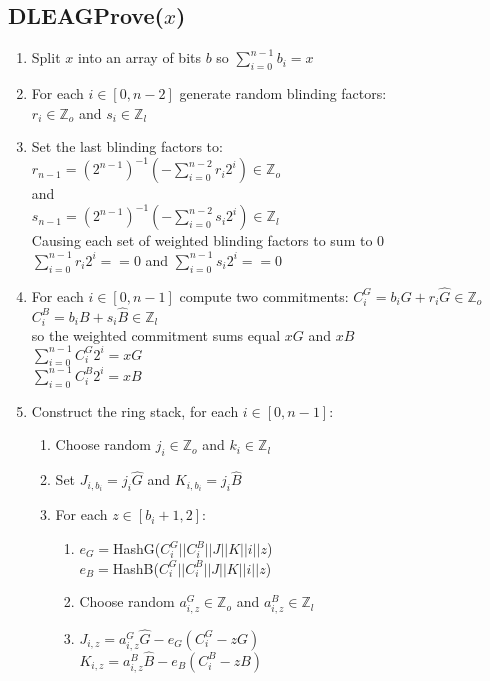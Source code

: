 \documentclass[a4paper]{article}
\begin{document}
\subsection{DLEAGProve($x$)}
\begin{enumerate}
    \item Split $x$ into an array of bits $b$ so $\displaystyle\sum_{i=0}^{n-1}b_{i} = x$
    \item For each $i \in [0, n-2]$ generate random blinding factors:\\
          $r_{i} \in \mathbb{Z}_{o}$ and $s_{i} \in \mathbb{Z}_{l}$
    \item Set the last blinding factors to:\\
          $r_{n-1} = (2^{n-1})^{-1} (-\displaystyle\sum_{i=0}^{n-2} r_{i}2^{i}) \in \mathbb{Z}_{o}$\\
          and\\
          $s_{n-1} = (2^{n-1})^{-1} (-\displaystyle\sum_{i=0}^{n-2} s_{i}2^{i})\in \mathbb{Z}_{l}$\\
          Causing each set of weighted blinding factors to sum to $0$\\
          $\sum_{i=0}^{n-1} r_{i}2^{i} == 0$ and $\sum_{i=0}^{n-1} s_{i}2^{i} == 0$
    \item For each $i \in [0, n-1]$ compute two commitments:
        $C^{G}_{i} = b_{i}G + r_{i}\hat{G} \in \mathbb{Z}_{o}$\\
        $C^{B}_{i} = b_{i}B + s_{i}\hat{B} \in \mathbb{Z}_{l}$\\
        so the weighted commitment sums equal $xG$ and $xB$\\
        $\sum_{i=0}^{n-1} C^{G}_{i}2^{i} = xG$\\
        $\sum_{i=0}^{n-1} C^{B}_{i}2^{i} = xB$
    \item Construct the ring stack, for each $i \in [0, n-1]$:
        \begin{enumerate}
            \item Choose random $j_{i} \in \mathbb{Z}_{o} $ and $ k_{i} \in \mathbb{Z}_{l}$
            \item Set $J_{i,b_{i}} = j_{i}\hat{G}$ and $K_{i,b_{i}} = j_{i}\hat{B}$
            \item For each $z \in [b_{i}+1, 2]$:
                \begin{enumerate}
                    \item $e_{G} = $HashG($C^{G}_{i}||C^{B}_{i}||J||K||i||z$)\\
                          $e_{B} = $HashB($C^{G}_{i}||C^{B}_{i}||J||K||i||z$)
                    \item Choose random $a^{G}_{i,z} \in \mathbb{Z}_{o} $ and $ a^{B}_{i,z} \in \mathbb{Z}_{l}$
                    \item $J_{i,z} = a^{G}_{i,z}\hat{G} - e_{G}(C^{G}_{i} - zG)$\\
                          $K_{i,z} = a^{B}_{i,z}\hat{B} - e_{B}(C^{B}_{i} - zB)$
                \end{enumerate}


\end{enumerate}
\end{enumerate}
\end{document}

